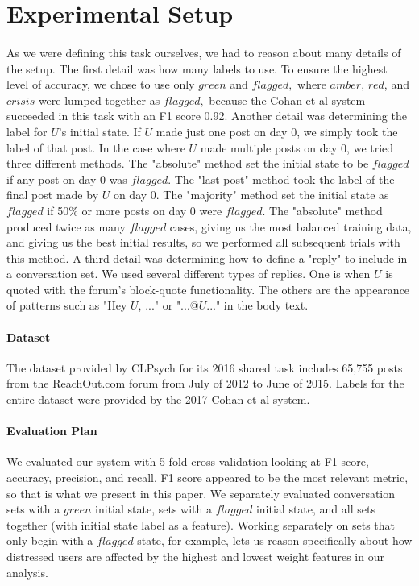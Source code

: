 \documentclass{article}
\begin{document}
\section{Experimental Setup}

\paragraph{}As we were defining this task ourselves, we had to reason about many details of the setup. The first detail was how many labels to use. To ensure the highest level of accuracy, we chose to use only $green$ and $flagged,$ where $amber$, $red$, and $crisis$ were lumped together as $flagged,$ because the Cohan et al system succeeded in this task with an F1 score 0.92. Another detail was determining the label for $U$'s initial state. If $U$ made just one post on day 0, we simply took the label of that post. In the case where $U$ made multiple posts on day 0, we tried three different methods. The "absolute" method set the initial state to be $flagged$ if any post on day 0 was $flagged$. The "last post" method took the label of the final post made by $U$ on day 0. The "majority" method set the initial state as $flagged$ if 50\% or more posts on day 0 were $flagged$. The "absolute" method produced twice as many $flagged$ cases, giving us the most balanced training data, and giving us the best initial results, so we performed all subsequent trials with this method. A third detail was determining how to define a "reply" to include in a conversation set. We used several different types of replies. One is when $U$ is quoted with the forum's block-quote functionality. The others are the appearance of patterns such as "Hey $U$, ..." or "...@$U$..." in the body text.

\paragraph{Dataset}The dataset provided by CLPsych for its 2016 shared task includes 65,755 posts from the ReachOut.com forum from July of 2012 to June of 2015. Labels for the entire dataset were provided by the 2017 Cohan et al system.

\paragraph{Evaluation Plan}We evaluated our system with 5-fold cross validation looking at F1 score, accuracy, precision, and recall. F1 score appeared to be the most relevant metric, so that is what we present in this paper. We separately evaluated conversation sets with a $green$ initial state, sets with a $flagged$ initial state, and all sets together (with initial state label as a feature). Working separately on sets that only begin with a $flagged$ state, for example, lets us reason specifically about how distressed users are affected by the highest and lowest weight features in our analysis.
\end{document}
